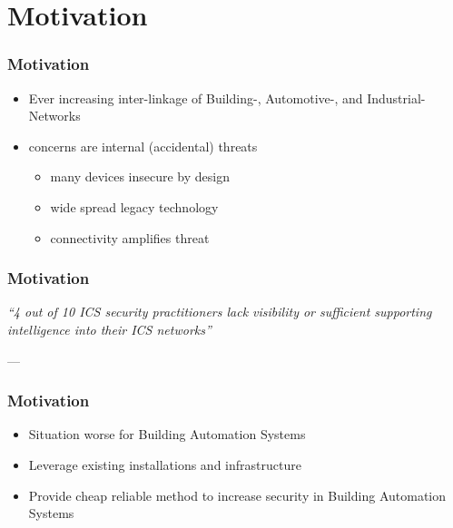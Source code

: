 
\section{Motivation}
\begin{frame}[c]
	\frametitle{Motivation}
	\begin{itemize}
		\item Ever increasing inter-linkage of Building-, Automotive-, and Industrial-Networks
		\item concerns are internal (accidental) threats \parencite{Gregory-Brown2017}
			\begin{itemize}
				\item many devices insecure by design
				\item wide spread legacy technology
				\item connectivity amplifies threat
			\end{itemize}
	\end{itemize}
	
	\note{}
\end{frame}

\begin{frame}[c]
	\frametitle{Motivation}
	\textit{\enquote{4 out of 10 ICS security practitioners lack visibility or sufficient supporting intelligence into their ICS networks}}
	
	\hspace{60mm} --- \textcite{Gregory-Brown2017}
\end{frame}

\begin{frame}[c]
	\frametitle{Motivation}
	\begin{itemize}
		\item Situation worse for Building Automation Systems
		\item Leverage existing installations and infrastructure
		\item Provide cheap reliable method to increase security in Building Automation Systems
	\end{itemize}
\end{frame}

